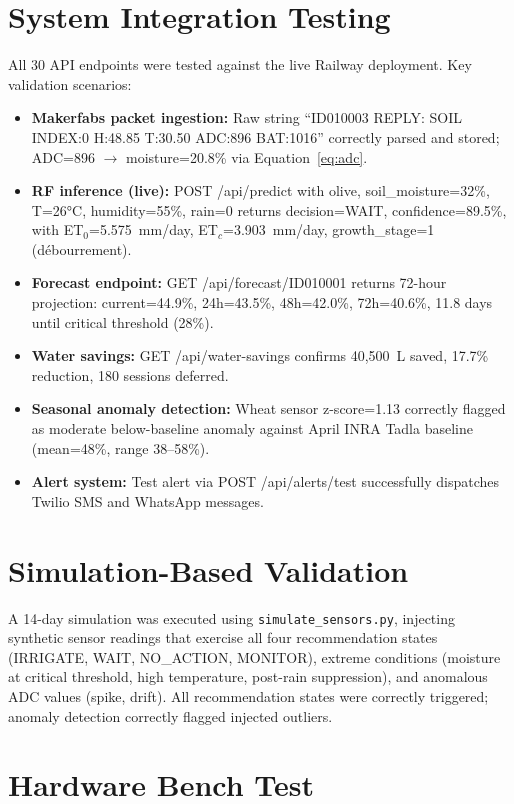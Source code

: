 \documentclass[12pt,a4paper]{report}
\begin{document}
\section{System Integration Testing}

All 30 API endpoints were tested against the live Railway deployment. Key validation scenarios:

\begin{itemize}
  \item \textbf{Makerfabs packet ingestion:} Raw string ``ID010003 REPLY: SOIL INDEX:0 H:48.85 T:30.50 ADC:896 BAT:1016'' correctly parsed and stored; ADC=896 \ensuremath{\rightarrow} moisture=20.8\% via Equation~\ref{eq:adc}.
  \item \textbf{RF inference (live):} POST /api/predict with olive, soil\_moisture=32\%, T=26°C, humidity=55\%, rain=0 returns decision=WAIT, confidence=89.5\%, with ET$_0$=5.575~mm/day, ET$_c$=3.903~mm/day, growth\_stage=1 (débourrement).
  \item \textbf{Forecast endpoint:} GET /api/forecast/ID010001 returns 72-hour projection: current=44.9\%, 24h=43.5\%, 48h=42.0\%, 72h=40.6\%, 11.8 days until critical threshold (28\%).
  \item \textbf{Water savings:} GET /api/water-savings confirms 40,500~L saved, 17.7\% reduction, 180 sessions deferred.
  \item \textbf{Seasonal anomaly detection:} Wheat sensor z-score=1.13 correctly flagged as moderate below-baseline anomaly against April INRA Tadla baseline (mean=48\%, range 38--58\%).
  \item \textbf{Alert system:} Test alert via POST /api/alerts/test successfully dispatches Twilio SMS and WhatsApp messages.
\end{itemize}

\section{Simulation-Based Validation}

A 14-day simulation was executed using \texttt{simulate\_sensors.py}, injecting synthetic sensor readings that exercise all four recommendation states (IRRIGATE, WAIT, NO\_ACTION, MONITOR), extreme conditions (moisture at critical threshold, high temperature, post-rain suppression), and anomalous ADC values (spike, drift). All recommendation states were correctly triggered; anomaly detection correctly flagged injected outliers.

\section{Hardware Bench Test}
\end{document}
